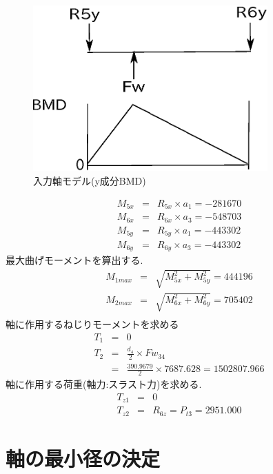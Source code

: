 \begin{figure}[htbp]
\begin{center}
\includegraphics[width=9cm]{../picture/jiku33.eps}
\end{center}
\caption{入力軸モデル(y成分BMD)}
\end{figure}
\begin{eqnarray}
M_{5x} &=& R_{5x} \times a_1       =-281670\\
M_{6x} &=& R_{6x} \times a_3       =-548703\\
M_{5y} &=& R_{5y} \times a_1       =-443302\\
M_{6y} &=& R_{6y} \times a_3       =-443302
\end{eqnarray}
最大曲げモーメントを算出する.
\begin{eqnarray}
M_{1max} &=& \sqrt {M_{5x}^2+M_{5y}^2} = 444196\\
M_{2max} &=& \sqrt {M_{6x}^2+M_{6y}^2} = 705402\\
\end{eqnarray}
軸に作用するねじりモーメントを求める
\begin{eqnarray}
T_{1} &=& 0\\
T_{2} &=& \frac{d_4}{2} \times Fw_{34}\\
      &=& \frac{390.9679}{2} \times 7687.628 = 1502807.966
\end{eqnarray}
軸に作用する荷重(軸力:スラスト力)を求める.
\begin{eqnarray}
T_{z1} &=& 0\\
T_{z2} &=& R_{6z} = P_{t3} = 2951.000
\end{eqnarray}





\newpage
\section{軸の最小径の決定}
